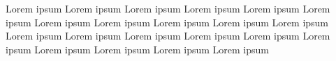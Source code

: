 Lorem ipsum Lorem ipsum Lorem ipsum Lorem ipsum Lorem ipsum Lorem ipsum Lorem ipsum Lorem ipsum Lorem ipsum Lorem ipsum Lorem ipsum Lorem ipsum Lorem ipsum Lorem ipsum Lorem ipsum Lorem ipsum Lorem ipsum Lorem ipsum Lorem ipsum Lorem ipsum Lorem ipsum 